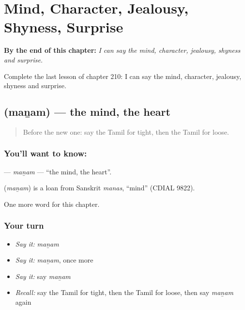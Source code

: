 
\chapter{Mind, Character, Jealousy, Shyness, Surprise}
\label{ch:ta-mind-character-jealousy-shyness-surprise}

\begin{chapteropening}
\textbf{By the end of this chapter:} \emph{I can say the mind, character, jealousy, shyness and surprise.}

Complete the last lesson of chapter 210: I can say the mind, character, jealousy, shyness and surprise.
\end{chapteropening}

\section[\texorpdfstring{\ta{மனம்} (maṉam)}{மனம் (maṉam)}]{ (maṉam) — the mind, the heart}

\label{lesson:TA-C210-manam}



\begin{quote}
Before the new one: say the Tamil for tight, then the Tamil for loose.
\end{quote}

\subsection*{You'll want to know: }
\textbf{} — \emph{maṉam} — \textquotedblleft{}the mind, the heart\textquotedblright{}.

\begin{cousinweb}
\textbf{} (\emph{maṉam}) is a loan from Sanskrit \emph{manas}, \textquotedblleft{}mind\textquotedblright{} (CDIAL 9822).
\end{cousinweb}

\begin{grammarlens}[title={What you've built}]
One more word for this chapter.
\end{grammarlens}

\subsection*{Your turn}
\begin{itemize}
\raggedright
  \item \emph{Say it:} \emph{maṉam}
  \item \emph{Say it:} \emph{maṉam}, once more
  \item \emph{Say it:} say \emph{maṉam}
  \item \emph{Recall:} say the Tamil for tight, then the Tamil for loose, then say \emph{maṉam} again
\end{itemize}

